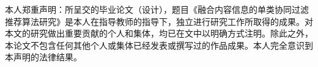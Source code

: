 \newpage

\centerline{\heiti{}}


\vskip 3cm 


\begin{spacing}{2.0}
本人郑重声明：所呈交的毕业论文（设计），题目《融合内容信息的单类协同过滤推荐算法研究》是本人在指导教师的指导下，独立进行研究工作所取得的成果。对本文的研究做出重要贡献的个人和集体，均已在文中以明确方式注明。除此之外，本论文不包含任何其他个人或集体已经发表或撰写过的作品成果。本人完全意识到本声明的法律结果。

\vskip 3cm

{}
\end{spacing}


